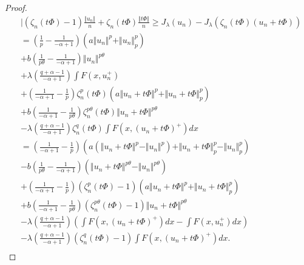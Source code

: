 \documentclass[10pt,a4paper]{amsart}
\begin{document}
\begin{proof}
\begin{equation}
\begin{aligned}
& \vert (\zeta_n(t\Phi) -1)\frac{\Vert u_n\Vert}{n} +\zeta_n(t\Phi)\frac{\Vert t\Phi\Vert}{n} 
\geq J_{\lambda}(u_n) -J_{\lambda}(\zeta_n(t\Phi)(u_n +t\Phi))\\
& = \left( \frac{1}{p} -\frac{1}{-\alpha +1}\right)\left( a \Vert u_n \Vert^p + \Vert u_n \Vert_{p}^{p}\right)\\
& +b\left( \frac{1}{p\theta} -\frac{1}{-\alpha +1}\right)\Vert u_n \Vert^{p \theta}\\
& +\lambda\left( \frac{q +\alpha -1}{-\alpha +1}\right) \int F(x,u_n^+)\\
& +\left(\frac{1}{-\alpha +1} - \frac{1}{p}\right)\zeta_n^{p}(t\Phi) \left( a \Vert u_n +t\Phi \Vert^p + \Vert u_n +t\Phi \Vert_{p}^{p}\right)\\
& +b\left( \frac{1}{-\alpha +1} -\frac{1}{p\theta}\right)\zeta_n^{p\theta}(t\Phi) \Vert u_n +t\Phi \Vert^{p \theta}\\
& -\lambda \left(  \frac{q +\alpha -1}{-\alpha +1}\right)\zeta^{q}_n(t\Phi) \int F(x,(u_n +t\Phi)^+)dx\\
& =\left(\frac{1}{-\alpha +1} - \frac{1}{p}\right)\left(a (\Vert u_n +t\Phi \Vert^p - \Vert u_n \Vert^p) +\Vert u_n +t\Phi \Vert_{p}^{p} -\Vert u_n \Vert_{p}^{p}\right)\\
& -b\left( \frac{1}{p\theta} -\frac{1}{-\alpha +1}\right)\left(  \Vert u_n +t\Phi \Vert^{p \theta} -\Vert u_n \Vert^{p \theta}\right)\\
& +\left(\frac{1}{-\alpha +1} - \frac{1}{p}\right)(\zeta_n^{p}(t\Phi) -1)\left( a \Vert u_n +t\Phi \Vert^p + \Vert u_n +t\Phi \Vert_{p}^{p}\right)\\
& +b\left( \frac{1}{-\alpha +1} -\frac{1}{p\theta}\right)(\zeta_n^{p\theta}(t\Phi) -1)\Vert u_n +t\Phi \Vert^{p \theta}\\
& -\lambda\left(  \frac{q +\alpha -1}{-\alpha +1}\right)\left( \int F(x,(u_n +t\Phi)^+)dx -\int F(x,u_n^+)dx\right)\\
& -\lambda\left(  \frac{q +\alpha -1}{-\alpha +1}\right)(\zeta^{q}_n(t\Phi) -1)\int F(x,(u_n +t\Phi)^+)dx. \\
\end{aligned}
\end{equation}


\end{proof}
\end{document}
